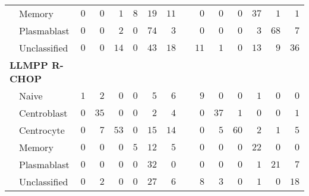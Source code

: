 \begin{table}[!tbp]
{\begin{center}
\begin{tabular}{lrrrrrrcrrrrrr}
~~Memory&$0$&$ 0$&$  1$&$8$&$19$&$11$&&$ 0$&$ 0$&$  0$&$37$&$ 1$&$ 1$\tabularnewline
~~Plasmablast&$0$&$ 0$&$  2$&$0$&$74$&$ 3$&&$ 0$&$ 0$&$  0$&$ 3$&$68$&$ 7$\tabularnewline
~~Unclassified&$0$&$ 0$&$ 14$&$0$&$43$&$18$&&$11$&$ 1$&$  0$&$13$&$ 9$&$36$\tabularnewline
\hline
{\bfseries LLMPP R-CHOP}&&&&&&&&&&&&&\tabularnewline
~~Naive&$1$&$ 2$&$  0$&$0$&$ 5$&$ 6$&&$ 9$&$ 0$&$  0$&$ 1$&$ 0$&$ 0$\tabularnewline
~~Centroblast&$0$&$35$&$  0$&$0$&$ 2$&$ 4$&&$ 0$&$37$&$  1$&$ 0$&$ 0$&$ 1$\tabularnewline
~~Centrocyte&$0$&$ 7$&$ 53$&$0$&$15$&$14$&&$ 0$&$ 5$&$ 60$&$ 2$&$ 1$&$ 5$\tabularnewline
~~Memory&$0$&$ 0$&$  0$&$5$&$12$&$ 5$&&$ 0$&$ 0$&$  0$&$22$&$ 0$&$ 0$\tabularnewline
~~Plasmablast&$0$&$ 0$&$  0$&$0$&$32$&$ 0$&&$ 0$&$ 0$&$  0$&$ 1$&$21$&$ 7$\tabularnewline
~~Unclassified&$0$&$ 2$&$  0$&$0$&$27$&$ 6$&&$ 8$&$ 3$&$  0$&$ 1$&$ 0$&$18$\tabularnewline
\hline
\end{tabular}\end{center}}

\end{table}
